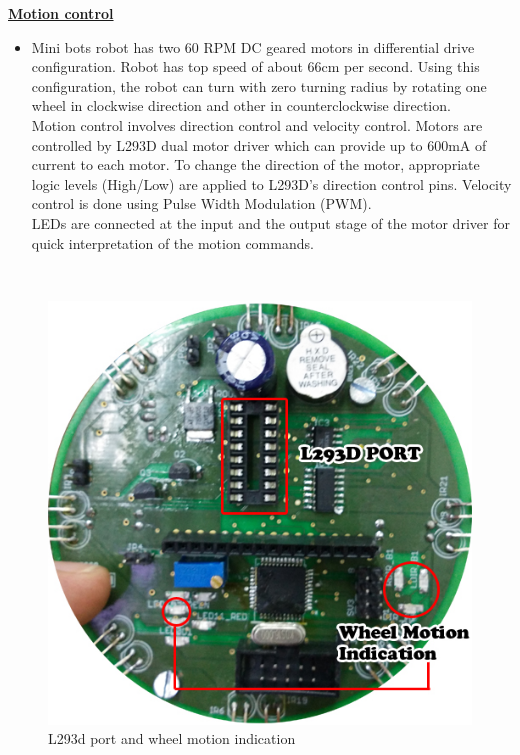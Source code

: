 \documentclass[a4paper,12pt,oneside]{book}
\begin{document}
	\underline{\textbf{\Large{Motion control}}}
	\begin{itemize}
	\item {Mini bots robot has two 60 RPM DC geared motors in differential drive configuration. Robot has top speed of about 66cm per second. Using this
		configuration, the robot can turn with zero turning radius by rotating one wheel in clockwise
		direction and other in counterclockwise direction.\\
		Motion control involves direction control and velocity control. Motors are controlled by L293D
		dual motor driver which can provide up to 600mA of current to each motor. To change the
		direction of the motor, appropriate logic levels (High/Low) are applied to L293D’s direction
		control pins. Velocity control is done using Pulse Width Modulation (PWM).\\
		LEDs are connected at the input and the output stage of the motor driver for quick interpretation
		of the motion commands.}
	\end{itemize}
	\hfill\\
	\begin{figure}[h!]
		\caption{L293d port and wheel motion indication}
		\includegraphics[width=\textwidth]{./HardwareManual/WheelMotionIndication_L293D.jpg}
	\end{figure}
	\hfill\\
		
\end{document}
